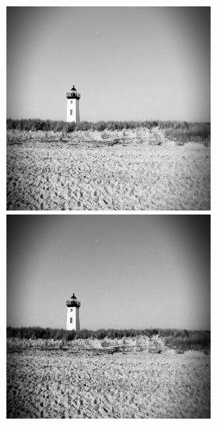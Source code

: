 \documentclass[12pt,a4paper,notitlepage,oneside,amsmath,amssymb]{article}
\begin{document}
\begin{CJK*}{UTF8}{bkai}
\begin{enumerate}[label=(\alph*)]
\begin{figure}[hbt!]
\begin{minipage}{.25\textwidth}
            \end{minipage}%
            \begin{minipage}{.25\textwidth}
              \centering
              \includegraphics[width=.95\linewidth]{imageC-2}
            \end{minipage}%
            \begin{minipage}{.25\textwidth}
              \centering
              \includegraphics[width=.95\linewidth]{imageC-3}

\end{minipage}
\end{figure}
\end{enumerate}
\end{CJK*}
\end{document}
